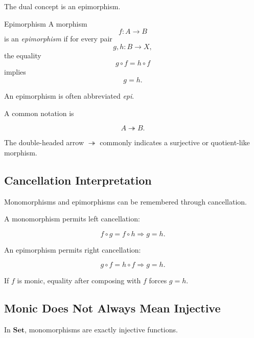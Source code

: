 The dual concept is an epimorphism.

\begin{definitionbox}{Epimorphism}
A morphism
\[ f:A\to B \]
is an \emph{epimorphism} if for every pair
\[ g,h:B\to X, \]
the equality
\[ g\circ f=h\circ f \]
implies
\[ g=h. \]
\end{definitionbox}

An epimorphism is often abbreviated \emph{epi}.

A common notation is

\[ A\twoheadrightarrow B. \]

The double-headed arrow \(\twoheadrightarrow\) commonly indicates a
surjective or quotient-like morphism.

\subsection{Cancellation Interpretation}
\label{subsec:categorical-cancellation}

Monomorphisms and epimorphisms can be remembered through cancellation.

A monomorphism permits left cancellation:

\[ f\circ g=f\circ h\Longrightarrow g=h. \]

An epimorphism permits right cancellation:

\[ g\circ f=h\circ f\Longrightarrow g=h. \]

\begin{center}
\end{center}

If \(f\) is monic, equality after composing with \(f\) forces \(g=h\).

\subsection{Monic Does Not Always Mean Injective}
\label{subsec:monic-not-injective}

In \(\mathbf{Set}\), monomorphisms are exactly injective functions.

